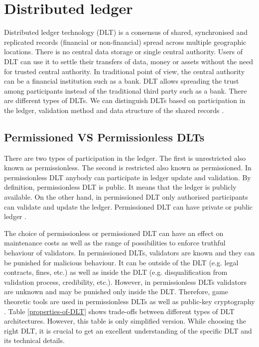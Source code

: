 \section{Distributed ledger}
\quad Distributed ledger technology (DLT) is a consensus of shared, synchronised and replicated records (financial or non-financial) spread across multiple geographic locations. There is no central data storage or single central authority. Users of DLT can use it to settle their transfers of data, money or assets without the need for trusted central authority. In traditional point of view, the central authority can be a financial institution such as a bank. DLT allows spreading the trust among participants instead of the traditional third party such as a bank. There are different types of DLTs. We can distinguish DLTs based on participation in the ledger, validation method and data structure of the shared records \cite{pinna_distributed_2016}.

\subsection{Permissioned VS Permissionless DLTs}
There are two types of participation in the ledger. The first is unrestricted also known as permissionless. The second is restricted also known as permissioned\cite{mattila_blockchain_2016}. In permissionless DLT anybody can participate in ledger update and validation. By definition, permissionless DLT is public. It means that the ledger is publicly available. On the other hand, in permissioned DLT only authorised participants can validate and update the ledger. Permissioned DLT can have private or public ledger \cite{pinna_distributed_2016}.

The choice of permissionless or permissioned DLT can have an effect on maintenance costs as well as the range of possibilities to enforce truthful behaviour of validators. In permissioned DLTs, validators are known and they can be punished for malicious behaviour. It can be outside of the DLT (e.g. legal contracts, fines, etc.) as well as inside the DLT (e.g. disqualification from validation process, credibility, etc.). However, in permissionless DLTs validators are unknown and may be punished only inside the DLT. Therefore, game theoretic tools are used in permissionless DLTs as well as public-key cryptography \cite{mattila_blockchain_2016}. Table \ref{properties-of-DLT} shows trade-offs between different types of DLT architectures. However, this table is only simplified version. While choosing the right DLT, it is crucial to get an excellent understanding of the specific DLT and its technical details.

